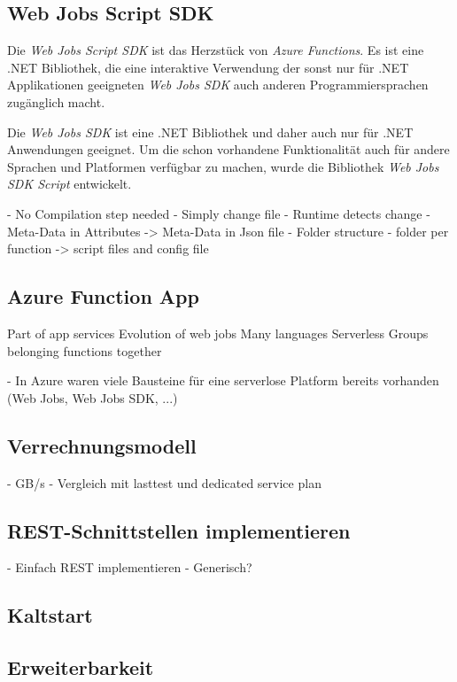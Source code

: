 \subsection{Web Jobs Script SDK}

Die \textit{Web Jobs Script SDK} ist das Herzstück von \textit{Azure Functions}. Es ist eine .NET Bibliothek, die eine interaktive Verwendung der sonst nur für .NET Applikationen geeigneten \textit{Web Jobs SDK} auch anderen Programmiersprachen zugänglich macht.

Die \textit{Web Jobs SDK} ist eine .NET Bibliothek und daher auch nur für .NET Anwendungen geeignet. Um die schon vorhandene Funktionalität auch für andere Sprachen und Platformen verfügbar zu machen, wurde die Bibliothek \textit{Web Jobs SDK Script} entwickelt.

- No Compilation step needed
- Simply change file - Runtime detects change
- Meta-Data in Attributes -> Meta-Data in Json file
- Folder structure - folder per function -> script files and config file


\subsection{Azure Function App}

Part of app services
Evolution of web jobs
Many languages
Serverless
Groups belonging functions together

- In Azure waren viele Bausteine für eine serverlose Platform bereits vorhanden (Web Jobs, Web Jobs SDK, ...)


\subsection{Verrechnungsmodell}

- GB/s
- Vergleich mit lasttest und dedicated service plan

\subsection{REST-Schnittstellen implementieren}

- Einfach REST implementieren
- Generisch?

\subsection{Kaltstart}

\subsection{Erweiterbarkeit}

